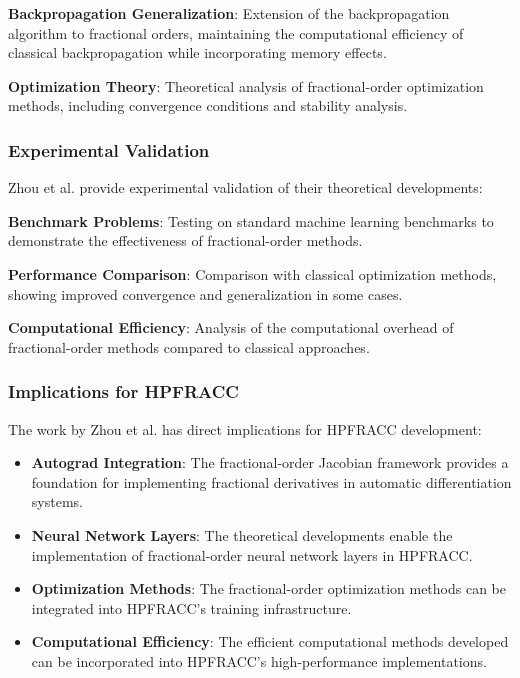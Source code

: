 \textbf{Backpropagation Generalization}: Extension of the backpropagation algorithm to fractional orders, maintaining the computational efficiency of classical backpropagation while incorporating memory effects.

\textbf{Optimization Theory}: Theoretical analysis of fractional-order optimization methods, including convergence conditions and stability analysis.

\subsubsection{Experimental Validation}

Zhou et al. provide experimental validation of their theoretical developments:

\textbf{Benchmark Problems}: Testing on standard machine learning benchmarks to demonstrate the effectiveness of fractional-order methods.

\textbf{Performance Comparison}: Comparison with classical optimization methods, showing improved convergence and generalization in some cases.

\textbf{Computational Efficiency}: Analysis of the computational overhead of fractional-order methods compared to classical approaches.

\subsubsection{Implications for HPFRACC}

The work by Zhou et al. has direct implications for HPFRACC development:

\begin{itemize}
    \item \textbf{Autograd Integration}: The fractional-order Jacobian framework provides a foundation for implementing fractional derivatives in automatic differentiation systems.
    \item \textbf{Neural Network Layers}: The theoretical developments enable the implementation of fractional-order neural network layers in HPFRACC.
    \item \textbf{Optimization Methods}: The fractional-order optimization methods can be integrated into HPFRACC's training infrastructure.
    \item \textbf{Computational Efficiency}: The efficient computational methods developed can be incorporated into HPFRACC's high-performance implementations.
\end{itemize}

